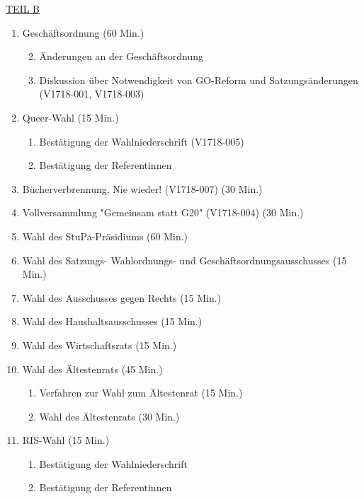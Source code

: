 \documentclass[ngerman,headheight=70pt]{scrartcl}
\begin{document}
    \underline{TEIL B}\\
    \begin{enumerate}[label={\textbf{Top \theenumi}},leftmargin=*]
        \item Geschäftsordnung (60 Min.)
            \begin{enumerate}
                \setcounter{enumii}{1}
                \item Änderungen an der Geschäftsordnung
                \item Diskussion über Notwendigkeit von GO-Reform und
                Satzungsänderungen (V1718-001, V1718-003)
            \end{enumerate}
        \item Queer-Wahl (15 Min.)
            \begin{enumerate}
                \item Bestätigung der Wahlniederschrift (V1718-005)
                \item Bestätigung der Referentinnen
            \end{enumerate}
        \item Bücherverbrennung, Nie wieder! (V1718-007) (30 Min.)
        \item Vollversammlung "Gemeinsam statt G20" (V1718-004) (30 Min.)
        \item Wahl des StuPa-Präsidiums (60 Min.)
        \item Wahl des Satzungs- Wahlordnungs- und  Geschäftsordnungsausschusses (15 Min.)
        \item Wahl des Ausschusses gegen Rechts (15 Min.)
        \item Wahl des Haushaltsausschusses (15 Min.)
        \item Wahl des Wirtschaftsrats (15 Min.)
        \item Wahl des Ältestenrats (45 Min.)
            \begin{enumerate}
                \item Verfahren zur Wahl zum Ältestenrat (15 Min.)
                \item Wahl des Ältestenrats (30 Min.)
            \end{enumerate}
        \item RIS-Wahl (15 Min.)
            \begin{enumerate}
                \item Bestätigung der Wahlniederschrift
                \item Bestätigung der Referentinnen
            \end{enumerate}

\end{enumerate}
\end{document}
